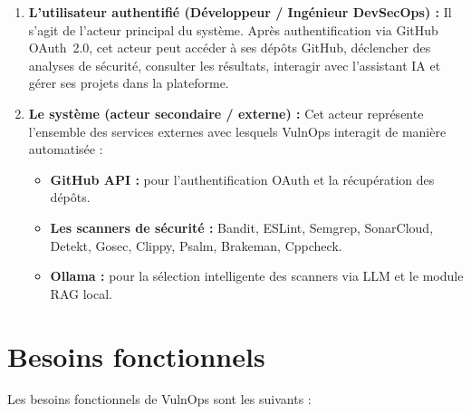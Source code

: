 \documentclass[12pt, a4paper, oneside]{report}
\begin{document}
\begin{enumerate}
    \item \textbf{L'utilisateur authentifié (Développeur / Ingénieur DevSecOps) :}
    Il s'agit de l'acteur principal du système. Après authentification via GitHub
    OAuth~2.0, cet acteur peut accéder à ses dépôts GitHub, déclencher des analyses
    de sécurité, consulter les résultats, interagir avec l'assistant IA et gérer
    ses projets dans la plateforme.
    
    \item \textbf{Le système (acteur secondaire / externe) :}
    Cet acteur représente l'ensemble des services externes avec lesquels VulnOps
    interagit de manière automatisée :
    \begin{itemize}
        \item \textbf{GitHub API :} pour l'authentification OAuth et la récupération
        des dépôts.
        \item \textbf{Les scanners de sécurité :} Bandit, ESLint, Semgrep, SonarCloud,
        Detekt, Gosec, Clippy, Psalm, Brakeman, Cppcheck.
        \item \textbf{Ollama :} pour la sélection intelligente des scanners
        via LLM et le module RAG local.
    \end{itemize}
\end{enumerate}

\section{Besoins fonctionnels}
\label{sec:besoins_fonctionnels}

Les besoins fonctionnels de VulnOps sont les suivants :
\end{document}
